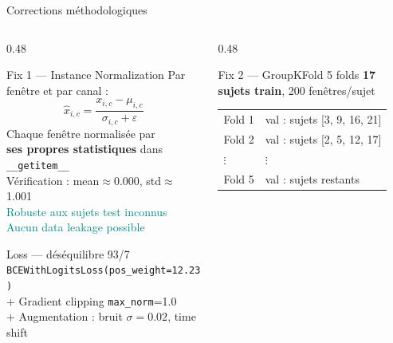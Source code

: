 \documentclass[aspectratio=169, 10pt]{beamer}
\begin{document}
\begin{frame}{Corrections méthodologiques}
    \begin{columns}[T]
        \begin{column}{0.48\textwidth}
            \begin{block}{\small Fix 1 — Instance Normalization}
                \small Par fenêtre et par canal :
                \[
                    \hat{x}_{i,c} =
                    \frac{x_{i,c} - \mu_{i,c}}{\sigma_{i,c} + \varepsilon}
                \]
                Chaque fenêtre normalisée par\\
                \textbf{ses propres statistiques} dans \texttt{\_\_getitem\_\_}\\[4pt]
                Vérification : mean$\approx$0.000, std$\approx$1.001 \checkmark\\[4pt]
                \textcolor{Teal}{Robuste aux sujets test inconnus}\\
                \textcolor{Teal}{Aucun data leakage possible}
            \end{block}
            \vspace{0.15cm}
            \begin{block}{\small Loss — déséquilibre 93/7}
                \small \texttt{BCEWithLogitsLoss(pos\_weight=12.23)}\\
                + Gradient clipping \texttt{max\_norm}=1.0\\
                + Augmentation : bruit $\sigma=0.02$, time shift
            \end{block}
        \end{column}
        \begin{column}{0.48\textwidth}
            \begin{block}{\small Fix 2 — GroupKFold 5 folds}
                \small \textbf{17 sujets train}, 200 fenêtres/sujet
                \vspace{0.1cm}
                \begin{tabular}{@{}ll@{}}
                    \small Fold 1 & val : sujets [3, 9, 16, 21] \\
                    \small Fold 2 & val : sujets [2, 5, 12, 17] \\
                    \small $\vdots$ & $\vdots$ \\
                    \small Fold 5 & val : sujets restants \\
                \end{tabular}
                \vspace{0.1cm}


\end{block}
\end{column}
\end{columns}
\end{frame}
\end{document}
